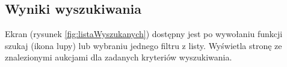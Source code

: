 \documentclass[a4paper,twoside,titlepage,openright]{book}
\begin{document}
\subsection{Wyniki wyszukiwania}
Ekran (rysunek \ref{fig:listaWyszukanych}) dostępny jest po wywołaniu funkcji szukaj (ikona lupy) lub wybraniu jednego filtru z listy. Wyświetla stronę ze znalezionymi aukcjami dla zadanych kryteriów wyszukiwania.

\begin{figure}[h]

	\centering
	\begin{minipage}[t]{0.3\textwidth}
		\setlength{\fboxsep}{1pt}

\end{minipage}
\end{figure}
\end{document}
